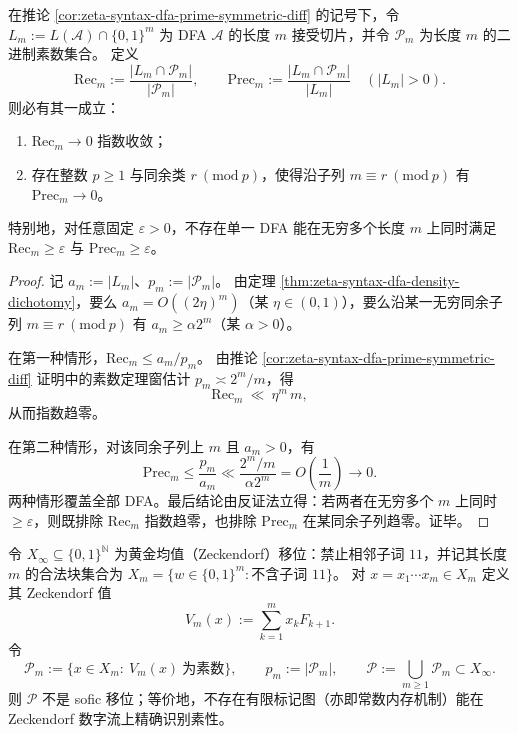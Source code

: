 \begin{corollary}\label{cor:zeta-syntax-dfa-prime-recall-precision-collapse}
在推论 \ref{cor:zeta-syntax-dfa-prime-symmetric-diff} 的记号下，令 \(L_m:=L(\mathcal A)\cap\{0,1\}^m\) 为 DFA \(\mathcal A\) 的长度 \(m\) 接受切片，并令 \(\mathcal P_m\) 为长度 \(m\) 的二进制素数集合。
定义
\[
\mathrm{Rec}_m:=\frac{|L_m\cap \mathcal P_m|}{|\mathcal P_m|},
\qquad
\mathrm{Prec}_m:=\frac{|L_m\cap \mathcal P_m|}{|L_m|}
\quad(|L_m|>0).
\]
则必有其一成立：
\begin{enumerate}
  \item \(\mathrm{Rec}_m\to 0\) 指数收敛；
  \item 存在整数 \(p\ge 1\) 与同余类 \(r\ (\mathrm{mod}\ p)\)，使得沿子列 \(m\equiv r\ (\mathrm{mod}\ p)\) 有 \(\mathrm{Prec}_m\to 0\)。
\end{enumerate}
特别地，对任意固定 \(\varepsilon>0\)，不存在单一 DFA 能在无穷多个长度 \(m\) 上同时满足 \(\mathrm{Rec}_m\ge \varepsilon\) 与 \(\mathrm{Prec}_m\ge \varepsilon\)。
\end{corollary}

\begin{proof}
记 \(a_m:=|L_m|\)、\(p_m:=|\mathcal P_m|\)。
由定理 \ref{thm:zeta-syntax-dfa-density-dichotomy}，要么 \(a_m=O((2\eta)^m)\)（某 \(\eta\in(0,1)\)），要么沿某一无穷同余子列 \(m\equiv r\ (\mathrm{mod}\ p)\) 有 \(a_m\ge \alpha 2^m\)（某 \(\alpha>0\)）。
\par
在第一种情形，\(\mathrm{Rec}_m\le a_m/p_m\)。
由推论 \ref{cor:zeta-syntax-dfa-prime-symmetric-diff} 证明中的素数定理窗估计 \(p_m\asymp 2^m/m\)，得
\[
\mathrm{Rec}_m\ \ll\ \eta^m\,m,
\]
从而指数趋零。
\par
在第二种情形，对该同余子列上 \(m\) 且 \(a_m>0\)，有
\[
\mathrm{Prec}_m
\le \frac{p_m}{a_m}
\ll \frac{2^m/m}{\alpha 2^m}
=O\!\left(\frac{1}{m}\right)\to 0.
\]
两种情形覆盖全部 DFA。最后结论由反证法立得：若两者在无穷多个 \(m\) 上同时 \(\ge\varepsilon\)，则既排除 \(\mathrm{Rec}_m\) 指数趋零，也排除 \(\mathrm{Prec}_m\) 在某同余子列趋零。证毕。
\end{proof}

\begin{theorem}\label{thm:zeta-syntax-zeckendorf-primes-not-sofic}
令 \(X_\infty\subseteq\{0,1\}^{\mathbb N}\) 为黄金均值（Zeckendorf）移位：禁止相邻子词 \(11\)，并记其长度 \(m\) 的合法块集合为
\(
X_m=\{w\in\{0,1\}^m:\text{不含子词 }11\}
\)。
对 \(x=x_1\cdots x_m\in X_m\) 定义其 Zeckendorf 值
\[
V_m(x):=\sum_{k=1}^m x_k F_{k+1}.
\]
令
\[
\mathcal P_m:=\{x\in X_m:\ V_m(x)\ \text{为素数}\},
\qquad
p_m:=|\mathcal P_m|,
\qquad
\mathcal P:=\bigcup_{m\ge 1}\mathcal P_m\subset X_\infty.
\]
则 \(\mathcal P\) 不是 sofic 移位；等价地，不存在有限标记图（亦即常数内存机制）能在 Zeckendorf 数字流上精确识别素性。
\end{theorem}

